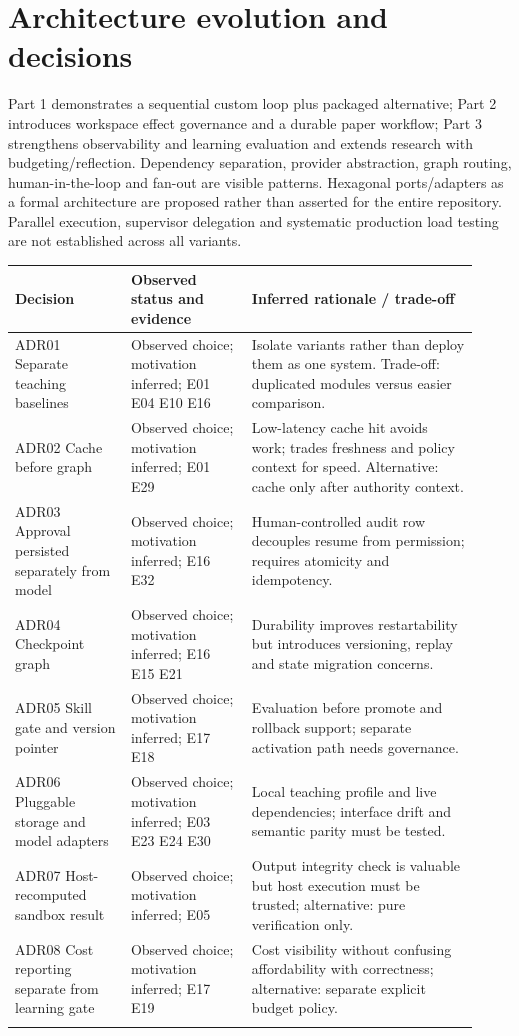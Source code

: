 \documentclass[10pt,letterpaper]{article}
\begin{document}
\section{Architecture evolution and decisions}
Part 1 demonstrates a sequential custom loop plus packaged alternative; Part 2 introduces workspace effect governance and a durable paper workflow; Part 3 strengthens observability and learning evaluation and extends research with budgeting/reflection. Dependency separation, provider abstraction, graph routing, human-in-the-loop and fan-out are visible patterns. Hexagonal ports/adapters as a formal architecture are proposed rather than asserted for the entire repository. Parallel execution, supervisor delegation and systematic production load testing are not established across all variants.
\begin{longtable}{@{}>{\raggedright\arraybackslash}p{0.23\linewidth}>{\raggedright\arraybackslash}p{0.24\linewidth}>{\raggedright\arraybackslash}p{0.45\linewidth}@{}}
\toprule
Decision & Observed status and evidence & Inferred rationale / trade-off\\\midrule\endhead
ADR01 Separate teaching baselines & Observed choice; motivation inferred; E01 E04 E10 E16 & Isolate variants rather than deploy them as one system. Trade-off: duplicated modules versus easier comparison.\\\addlinespace
ADR02 Cache before graph & Observed choice; motivation inferred; E01 E29 & Low-latency cache hit avoids work; trades freshness and policy context for speed. Alternative: cache only after authority context.\\\addlinespace
ADR03 Approval persisted separately from model & Observed choice; motivation inferred; E16 E32 & Human-controlled audit row decouples resume from permission; requires atomicity and idempotency.\\\addlinespace
ADR04 Checkpoint graph & Observed choice; motivation inferred; E16 E15 E21 & Durability improves restartability but introduces versioning, replay and state migration concerns.\\\addlinespace
ADR05 Skill gate and version pointer & Observed choice; motivation inferred; E17 E18 & Evaluation before promote and rollback support; separate activation path needs governance.\\\addlinespace
ADR06 Pluggable storage and model adapters & Observed choice; motivation inferred; E03 E23 E24 E30 & Local teaching profile and live dependencies; interface drift and semantic parity must be tested.\\\addlinespace
ADR07 Host-recomputed sandbox result & Observed choice; motivation inferred; E05 & Output integrity check is valuable but host execution must be trusted; alternative: pure verification only.\\\addlinespace
ADR08 Cost reporting separate from learning gate & Observed choice; motivation inferred; E17 E19 & Cost visibility without confusing affordability with correctness; alternative: separate explicit budget policy.\\\addlinespace
\bottomrule\end{longtable}
\end{document}
